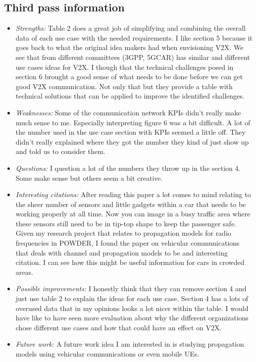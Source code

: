 \documentclass[letterpaper,twocolumn,10pt]{article}
\begin{document}
\subsection{Third pass information}
\label{sec:third}
\begin{itemize}

\item {\it Strengths:} 
Table 2 does a great job of simplifying and combining the overall data of each use case with the needed requirements.
I like section 5 because it goes back to what the original idea makers had when envisioning V2X. We see that from 
different committees (3GPP, 5GCAR) has similar and different use cases ideas for V2X. I though that the technical
challenges posed in section 6 brought a good sense of what needs to be done before we can get good V2X
communication. Not only that but they provide a table with technical solutions that can be applied to improve the 
identified challenges. 

\item {\it Weaknesses:} 
Some of the communication network KPIs didn't really make much sense to me. Especially interpreting figure 6
was a bit difficult. A lot of the number used in the use case section with KPIs seemed a little off. They didn't really
explained where they got the number they kind of just show up and told us to consider them. 

\item {\it Questions:} I question a lot of the numbers they throw up in the section 4. Some make sense but others
seem a bit creative.

\item {\it Interesting citations:} 
After reading this paper a lot comes to mind relating to the sheer number of sensors and little gadgets within a car
that needs to be working properly at all time. Now you can image in a busy traffic area where these sensors still need
to be in tip-top shape to keep the passenger safe. Given my research project that relates to propagation models for 
radio frequencies in POWDER, I found the paper on vehicular communications~\cite{vehicularcomm} that deals with
channel and propagation models to be and interesting citation. I can see how this might be useful information for cars
in crowded areas.

\item {\it Possible improvements:} 
I honestly think that they can remove section 4 and just use table 2 to explain the ideas for each use case. Section
4 has a lots of overused data that in my opinions looks a lot nicer within the table. I would have like to have seen more 
evaluation about why the different organizations chose different use cases and how that could have an effect on V2X.

\item {\it Future work:} 
A future work idea I am interested in is studying propagation models using vehicular communications or even mobile
UEs. 



\end{itemize}

{
  \small 
  
  
}
\end{document}
